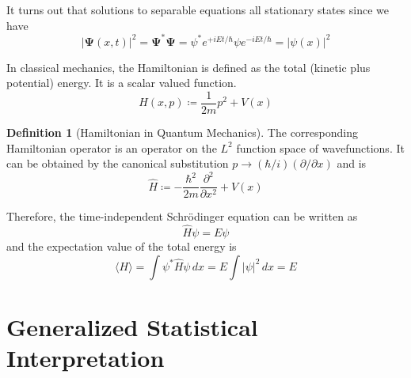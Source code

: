 \documentclass{article}
\theoremstyle{definition}
\newtheorem{definition}{Definition}[section]
\begin{document}
  It turns out that solutions to separable equations all stationary states since we have 
  \begin{equation} 
    |\boldsymbol{\Psi}(x, t)|^2 = \boldsymbol{\Psi}^\ast \boldsymbol{\Psi} = \psi^\ast e^{+i E t/\hbar} \psi e^{- i E t/\hbar} = |\psi (x)|^2
  \end{equation}



  In classical mechanics, the Hamiltonian is defined as the total (kinetic plus potential) energy. It is a scalar valued function.  
  \begin{equation} 
    H(x, p) \coloneqq \frac{1}{2m} p^2 + V(x) 
  \end{equation}

  \begin{definition}[Hamiltonian in Quantum Mechanics]
  The corresponding Hamiltonian operator is an operator on the $L^2$ function space of wavefunctions. It can be obtained by the canonical substitution $p \rightarrow (\hbar/i)(\partial /\partial x)$ and is 
    \begin{equation} 
      \hat{H} \coloneqq - \frac{\hbar^2}{2m} \frac{\partial^2}{\partial x^2} + V(x)
    \end{equation}  
  \end{definition}

  Therefore, the time-independent Schr\"odinger equation can be written as 
  \begin{equation} 
    \hat{H} \psi = E \psi 
  \end{equation}
  and the expectation value of the total energy is 
  \begin{equation} 
    \langle H \rangle = \int \psi^\ast \hat{H} \psi \,dx = E \int |\psi|^2 \,dx = E
  \end{equation}

\section{Generalized Statistical Interpretation}

  
\end{document}
